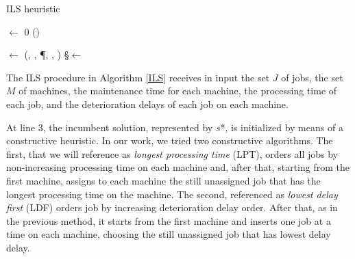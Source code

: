 \documentclass[a4paper,11pt]{article}
\begin{document}
\IncMargin{1em}
\begin{algorithm}[H]
\tiny
\caption{ILS heuristic}\label{ILS}
\SetAlgoLined



\Input{\JJ, \MM, \P, \D, \T}
\Output{\SS}

\NonImproveIters$\leftarrow$ 0 \;
\StartTimer(\Time)

\SS $\leftarrow$ \ConstructiveHeuristic(\JJ, \MM, \P, \D, \T)\;
\S $\leftarrow$ \SS

\end{algorithm}
\DecMargin{1em}

The ILS procedure in Algorithm \ref{ILS} receives in input the set $J$ of jobs, the set $M$ of machines, the maintenance time for each machine, the processing time of each job, and the deterioration delays of each job on each machine. 

At line 3, the incumbent solution, represented by $s$*, is initialized by means of a constructive heuristic. In our work, we tried two constructive algorithms. The first, that we will reference as \emph{ longest processing time} (LPT), orders all jobs by non-increasing processing time on each machine and, after that, starting from the first machine, assigns to each machine the still unassigned job that has the longest processing time on the machine. The second, referenced as \emph{lowest delay first} (LDF) orders job by increasing deterioration delay order. After that, as in the previous method, it starts from the first machine and inserts one job at a time on each machine, choosing the still unassigned job that has lowest delay delay. 
\end{document}
